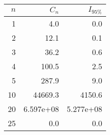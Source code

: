 \begin{tabular}{rrr}
\toprule
 $n$ &     $C_n$ &  $I_{95\%}$ \\
\midrule
   1 &       4.0 &         0.0 \\
   2 &      12.1 &         0.1 \\
   3 &      36.2 &         0.6 \\
   4 &     100.5 &         2.5 \\
   5 &     287.9 &         9.0 \\
  10 &   44669.3 &      4150.6 \\
  20 & 6.597e+08 &   5.277e+08 \\
  25 &       0.0 &         0.0 \\
\bottomrule
\end{tabular}
